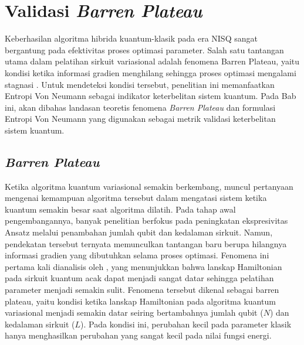 \section{Validasi \textit{Barren Plateau}}
\label{sec:barren_plateau}
Keberhasilan algoritma hibrida kuantum-klasik pada era NISQ sangat bergantung pada efektivitas proses optimasi parameter. Salah satu tantangan utama dalam pelatihan sirkuit variasional adalah fenomena Barren Plateau, yaitu kondisi ketika informasi gradien menghilang sehingga proses optimasi mengalami stagnasi . Untuk mendeteksi kondisi tersebut, penelitian ini memanfaatkan Entropi Von Neumann sebagai indikator keterbelitan sistem kuantum. Pada Bab ini, akan dibahas landasan teoretis fenomena \textit{Barren Plateau} dan formulasi Entropi Von Neumann yang digunakan sebagai metrik validasi keterbelitan sistem kuantum.

\subsection{\textit{Barren Plateau}}
Ketika algoritma kuantum variasional semakin berkembang, muncul pertanyaan mengenai kemampuan algoritma tersebut dalam mengatasi sistem ketika kuantum semakin besar saat algoritma dilatih. Pada tahap awal pengembangannya, banyak penelitian berfokus pada peningkatan ekspresivitas Ansatz melalui penambahan jumlah qubit dan kedalaman sirkuit. Namun, pendekatan tersebut ternyata memunculkan tantangan baru berupa hilangnya informasi gradien yang dibutuhkan selama proses optimasi. Fenomena ini pertama kali dianalisis oleh , yang menunjukkan bahwa lanskap Hamiltonian pada sirkuit kuantum acak dapat menjadi sangat datar sehingga pelatihan parameter menjadi semakin sulit. Fenomena tersebut dikenal sebagai barren plateau, yaitu kondisi ketika lanskap Hamiltonian pada algoritma kuantum variasional menjadi semakin datar seiring bertambahnya jumlah qubit ($N$) dan kedalaman sirkuit ($L$). Pada kondisi ini, perubahan kecil pada parameter klasik hanya menghasilkan perubahan yang sangat kecil pada nilai fungsi energi.

